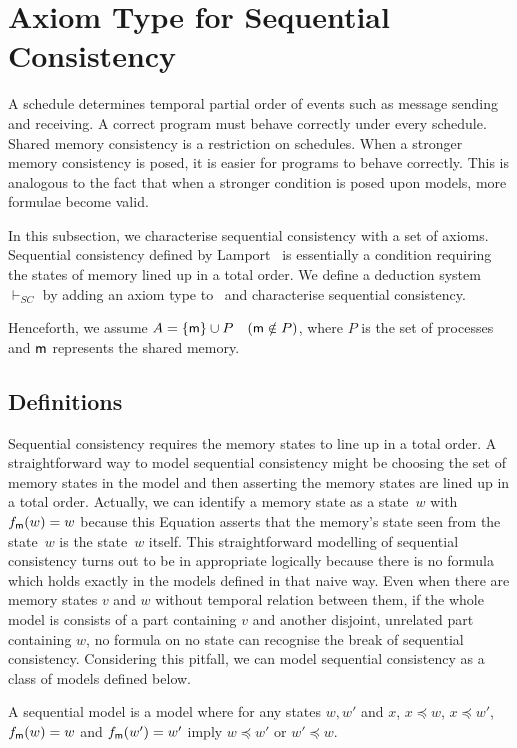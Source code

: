   \section{Axiom Type for Sequential Consistency}
  \label{sc}

 A schedule determines temporal partial order of events such as
 message sending and receiving.
 A correct program must behave correctly under every schedule.
 Shared memory consistency is a restriction on schedules.
 When a stronger memory consistency is posed, it is easier for programs to behave
 correctly.  This is analogous to the fact
 that when a stronger condition
 is posed upon models, more formulae become valid.

 In this subsection, we characterise sequential consistency with a set of axioms.
 Sequential consistency defined by Lamport~\cite{lamport1979make} is essentially a condition requiring the states of memory lined up
 in a total order.
 We define a deduction system $\vdash_{SC}$ by adding an axiom type to \iec\, and
 characterise sequential consistency.

 Henceforth, we assume $A = \{{\sf m}\}\cup P\quad ({\sf m}\notin P)$, where $P$ is the
 set of processes and ${\sf m}$ represents the shared memory.

  \subsection{Definitions}

  Sequential consistency requires
  the memory states to line up in a total order.
  A straightforward way to model sequential consistency might be
  choosing the set of memory states in the model
  and then asserting the memory states are lined up in a total order.
  Actually, we can identify a memory state as a state~$w$ with
  $f_{\sf m}(w) = w$ because this Equation asserts that
  the memory's state seen from the state~$w$ is the state~$w$ itself.
  This straightforward modelling of sequential consistency turns out to be
  in appropriate logically because there is no formula which holds exactly
  in the models defined in that naive way.
  Even when there are memory states $v$ and $w$ without
  temporal relation between them,
  if the whole model is consists of a part containing $v$ and another disjoint,
  unrelated part
  containing $w$,
  no formula on no state can recognise the break of sequential consistency.
  Considering this pitfall, we can model sequential consistency as a class of models defined below.
  \begin{definition}
   A sequential model is a model where for any states $w, w'$ and $x$,
   $x\preceq w$, $x\preceq w'$, $f_{\sf m}(w) = w$ and $f_{\sf m}(w') = w'$ imply
   $w\preceq w'$ or $w'\preceq w$.
  \end{definition}

